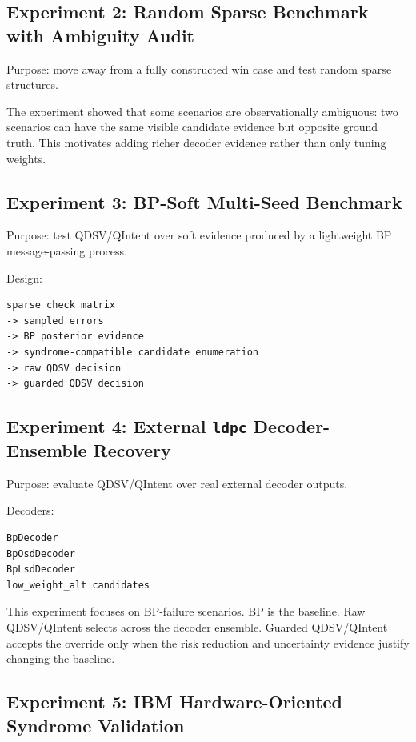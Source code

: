 \documentclass[11pt]{article}
\begin{document}
\subsection{Experiment 2: Random Sparse Benchmark with Ambiguity Audit}

Purpose: move away from a fully constructed win case and test random sparse structures.


The experiment showed that some scenarios are observationally ambiguous: two scenarios can have the same visible candidate evidence but opposite ground truth. This motivates adding richer decoder evidence rather than only tuning weights.


\subsection{Experiment 3: BP-Soft Multi-Seed Benchmark}

Purpose: test QDSV/QIntent over soft evidence produced by a lightweight BP message-passing process.


Design:


\begin{lstlisting}
sparse check matrix
-> sampled errors
-> BP posterior evidence
-> syndrome-compatible candidate enumeration
-> raw QDSV decision
-> guarded QDSV decision
\end{lstlisting}

\subsection{Experiment 4: External \texttt{ldpc} Decoder-Ensemble Recovery}

Purpose: evaluate QDSV/QIntent over real external decoder outputs.


Decoders:


\begin{lstlisting}
BpDecoder
BpOsdDecoder
BpLsdDecoder
low_weight_alt candidates
\end{lstlisting}

This experiment focuses on BP-failure scenarios. BP is the baseline. Raw QDSV/QIntent selects across the decoder ensemble. Guarded QDSV/QIntent accepts the override only when the risk reduction and uncertainty evidence justify changing the baseline.


\subsection{Experiment 5: IBM Hardware-Oriented Syndrome Validation}
\end{document}
